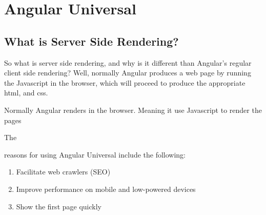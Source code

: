 \chapter{ Angular Universal }

\section{What is Server Side Rendering?}
\begin{quote}
\end{quote}

So what is server side rendering, and why is it different than Angular's regular client side rendering? Well, normally Angular produces a web page by running the Javascript in the browser, which will proceed to produce the appropriate html, and css. 


 Normally Angular renders in the browser. Meaning it use Javascript to render the pages 

The

reasons for using Angular Universal include the following:
\begin{enumerate}
  \item Facilitate web crawlers (SEO)
  \item Improve performance on mobile and low-powered devices
  \item Show the first page quickly
\end{enumerate}
